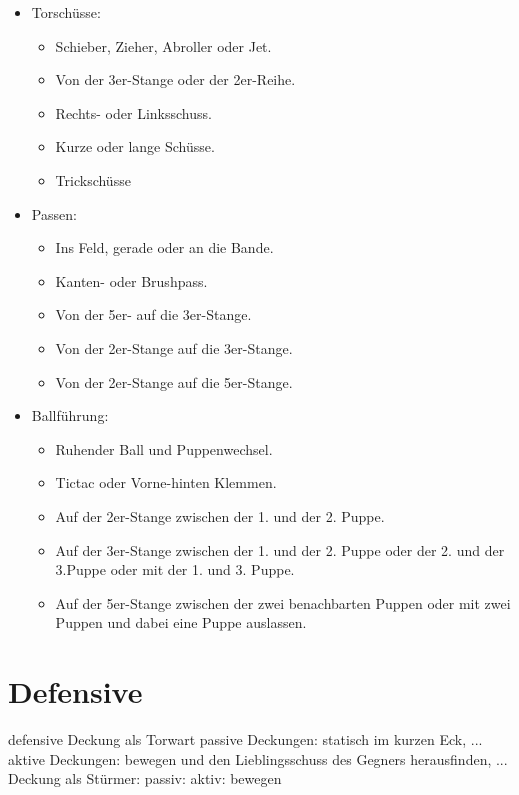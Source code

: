 \begin{itemize}
\item Torschüsse: 
\begin{itemize}
\item Schieber, Zieher, Abroller oder Jet.
\item Von der 3er-Stange oder der 2er-Reihe.
\item Rechts- oder Linksschuss.
\item Kurze oder lange Schüsse.
\item Trickschüsse
\end{itemize}
\item Passen:
\begin{itemize}
\item Ins Feld, gerade oder an die Bande.
\item Kanten- oder Brushpass.
\item Von der 5er- auf die 3er-Stange.
\item Von der 2er-Stange auf die 3er-Stange.
\item Von der 2er-Stange auf die 5er-Stange.
\end{itemize}
\item Ballführung: 
\begin{itemize}
\item Ruhender Ball und Puppenwechsel.
\item Tictac oder Vorne-hinten Klemmen.
\item Auf der 2er-Stange zwischen der 1. und der 2. Puppe.
\item Auf der 3er-Stange zwischen der 1. und der 2. Puppe oder der 2. und der 3.Puppe oder mit der 1. und 3. Puppe.
\item Auf der 5er-Stange zwischen der zwei benachbarten Puppen oder mit zwei Puppen und dabei eine Puppe auslassen.
\end{itemize}
\end{itemize}

\section{Defensive}
\label{technik:defensive}


\gls{defensive}
Deckung als Torwart
passive Deckungen: statisch im kurzen Eck, ...
aktive Deckungen: bewegen und den Lieblingsschuss des Gegners herausfinden, ...
Deckung als Stürmer:
passiv: 
aktiv: bewegen


